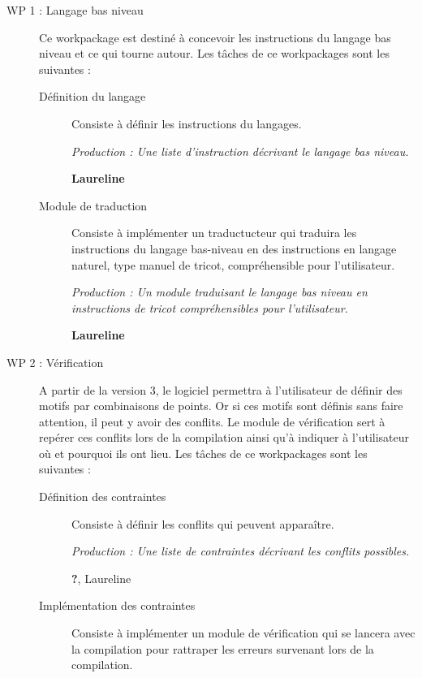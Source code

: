 \documentclass{article}
\begin{document}
\begin{description}
\item[WP 1 : Langage bas niveau] Ce workpackage est destiné à concevoir les instructions du langage bas niveau et ce qui tourne autour. Les tâches de ce workpackages sont les suivantes :

    \begin{description}
    \item[Définition du langage] Consiste à définir les instructions du langages.
      
      \textit{Production : Une liste d'instruction décrivant le langage bas niveau.}
      
      \textbf{Laureline}
      
    \item[Module de traduction] Consiste à implémenter un traductucteur qui traduira les instructions du langage bas-niveau en des instructions en langage naturel, type manuel de tricot, compréhensible pour l'utilisateur.
      
      \textit{Production : Un module traduisant le langage bas niveau en instructions de tricot compréhensibles pour l'utilisateur.}
      
      \textbf{Laureline}
    \end{description}
        
\medskip

\item[WP 2 : Vérification] A partir de la version 3, le logiciel permettra à l'utilisateur de définir des motifs par combinaisons de points. Or si ces motifs sont définis sans faire attention, il peut y avoir des conflits. Le module de vérification sert à repérer ces conflits lors de la compilation ainsi qu'à indiquer à l'utilisateur où et pourquoi ils ont lieu. Les tâches de ce workpackages sont les suivantes :

    \begin{description}
    \item[Définition des contraintes] Consiste à définir les conflits qui peuvent apparaître.
      
      \textit{Production : Une liste de contraintes décrivant les conflits possibles.}
      
      \textbf{?}, Laureline
      
    \item[Implémentation des contraintes] Consiste à implémenter un module de vérification qui se lancera avec la compilation pour rattraper les erreurs survenant lors de la compilation.
      

\end{description}
\end{description}
\end{document}
